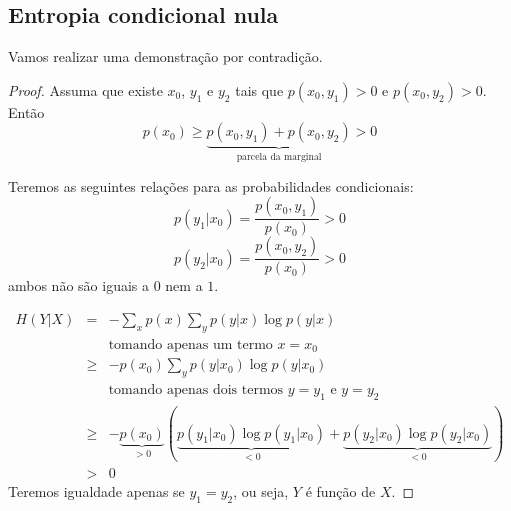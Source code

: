 \subsection{Entropia condicional nula}

\begin{questions}


\begin{solution}
Vamos realizar uma demonstração por contradição.

  \begin{proof}
Assuma que existe $x_0$, $y_1$ e $y_2$ tais que $p(x_0,y_1)>0$ e $p(x_0,y_2)>0$. Então
  \begin{equation}
  p(x_0) \geq \underbrace{ p(x_0,y_1) + p(x_0,y_2) }_{\text{parcela da marginal}} > 0
  \end{equation}

  Teremos as seguintes relações para as probabilidades condicionais:
  \begin{equation}
  p(y_1|x_0) = \frac{p(x_0,y_1)}{p(x_0)} > 0
  \end{equation}
  \begin{equation}
  p(y_2|x_0) = \frac{p(x_0,y_2)}{p(x_0)} > 0
  \end{equation}
  ambos não são iguais a $0$ nem a $1$.

  \begin{eqnarray}
  H(Y|X) &=& - \sum_x p(x) \sum_y p(y|x) \log p(y|x) \nonumber \\
        && \text{tomando apenas um termo } x=x_0 \nonumber \\
        &\geq& - p(x_0) \sum_y p(y|x_0) \log p(y|x_0) \nonumber \\
        && \text{tomando apenas dois termos } y=y_1 \text{ e } y=y_2 \nonumber \\
        &\geq& - \underbrace{p(x_0)}_{>0} \left( \underbrace{p(y_1|x_0) \log p(y_1|x_0)}_{< 0} + \underbrace{p(y_2|x_0) \log p(y_2|x_0)}_{< 0} \right) \nonumber \\
        &>& 0
  \end{eqnarray}
  Teremos igualdade apenas se $y_1 = y_2$, ou seja, $Y$ é função de $X$.

  \end{proof}
\end{solution}
\end{questions}
